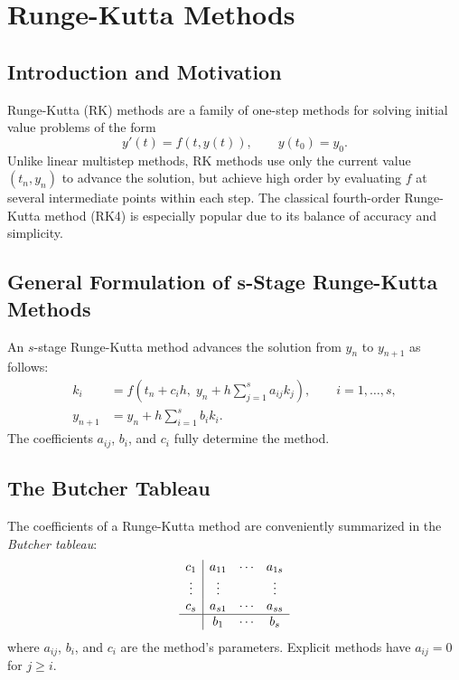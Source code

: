 
\chapter{Runge-Kutta Methods}
\label{chap:rk}

\section{Introduction and Motivation}
\label{sec:rk:intro}
Runge-Kutta (RK) methods are a family of one-step methods for solving initial value problems of the form
\begin{equation}
  y'(t) = f(t, y(t)), \qquad y(t_0) = y_0.
\end{equation}
Unlike linear multistep methods, RK methods use only the current value $(t_n, y_n)$ to advance the solution, but achieve high order by evaluating $f$ at several intermediate points within each step. The classical fourth-order Runge-Kutta method (RK4) is especially popular due to its balance of accuracy and simplicity.

\section{General Formulation of s-Stage Runge-Kutta Methods}
\label{sec:rk:general}
An $s$-stage Runge-Kutta method advances the solution from $y_n$ to $y_{n+1}$ as follows:
\begin{align*}
  k_i &= f\left(t_n + c_i h,\; y_n + h \sum_{j=1}^s a_{ij} k_j\right), \qquad i = 1, \ldots, s, \\
  y_{n+1} &= y_n + h \sum_{i=1}^s b_i k_i.
\end{align*}
The coefficients $a_{ij}$, $b_i$, and $c_i$ fully determine the method.

\section{The Butcher Tableau}
\label{sec:rk:butcher}
The coefficients of a Runge-Kutta method are conveniently summarized in the \emph{Butcher tableau}:
\begin{equation*}
\begin{array}{c|ccc}
  c_1 & a_{11} & \cdots & a_{1s} \\
  \vdots & \vdots & & \vdots \\
  c_s & a_{s1} & \cdots & a_{ss} \\
  \hline
      & b_1    & \cdots & b_s
\end{array}
\end{equation*}
where $a_{ij}$, $b_i$, and $c_i$ are the method's parameters. Explicit methods have $a_{ij} = 0$ for $j \geq i$.

